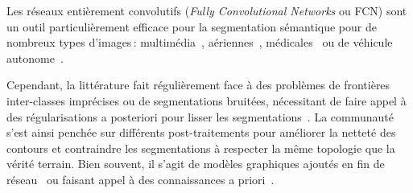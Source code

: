 Les réseaux entièrement convolutifs (\emph{Fully Convolutional Networks} ou FCN) sont un outil particulièrement efficace pour la segmentation sémantique pour de nombreux types d'images\,: multimédia~\cite{everingham_pascal_2014}, aériennes~\cite{rottensteiner_isprs_2012}, médicales~\cite{ulman_objective_2017} ou de véhicule autonome~\cite{cordts_cityscapes_2016}.

Cependant, la littérature fait régulièrement face à des problèmes de frontières inter-classes imprécises ou de segmentations bruitées, nécessitant de faire appel à des régularisations a posteriori pour lisser les segmentations~\cite{zheng_conditional_2015,l._c._chen_deeplab:_2017}.
La communauté s'est ainsi penchée sur différents post-traitements pour améliorer la netteté des contours et contraindre les segmentations à respecter la même topologie que la vérité terrain. Bien souvent, il s'agit de modèles graphiques ajoutés en fin de réseau~\cite{z._liu_deep_2017} ou faisant appel à des connaissances a priori~\cite{le_reformulating_2017,bertasius_semantic_2016}.

